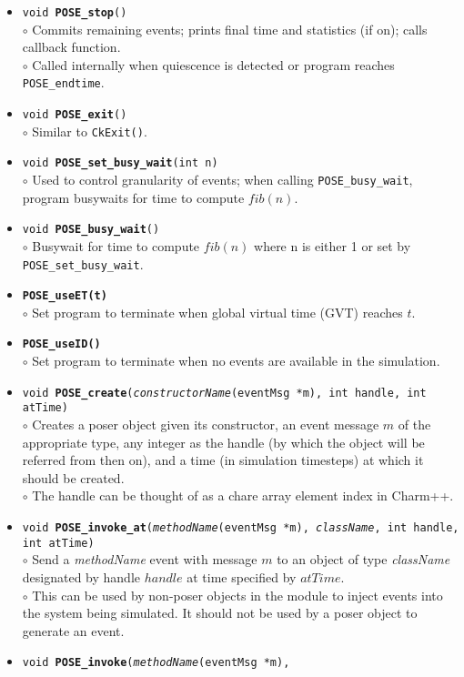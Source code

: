 \begin{itemize}
\item {\tt void {\bf POSE\_stop}()}\\
	$\circ$ Commits remaining events; prints final time and
	statistics (if on); calls callback function.\\
	$\circ$ Called internally when quiescence is detected or
	program reaches {\tt POSE\_endtime}.
\item {\tt void {\bf POSE\_exit}()}\\
	$\circ$ Similar to {\tt CkExit()}.
\item {\tt void {\bf POSE\_set\_busy\_wait}(int n)}\\
	$\circ$ Used to control granularity of events; when calling
	{\tt POSE\_busy\_wait}, program busywaits for time to compute $fib(n)$.
\item {\tt void {\bf POSE\_busy\_wait}()}\\
	$\circ$ Busywait for time to compute $fib(n)$ where n is either
	1 or set by {\tt POSE\_set\_busy\_wait}.
\item {\tt {\bf POSE\_useET(t)}}\\
	$\circ$ Set program to terminate when global
	virtual time (GVT) reaches $t$.
\item {\tt {\bf POSE\_useID()}}\\
	$\circ$ Set program to terminate when no events are available
	in the simulation.
\item {\tt void {\bf POSE\_create}({\it constructorName}(eventMsg *m), int
handle, int atTime)}\\
	$\circ$ Creates a poser object given its constructor, an event
	message $m$ of the appropriate type, any integer as the handle
	(by which the object will be referred from then on), and a
	time (in simulation timesteps) at which it should be created.\\ 
	$\circ$ The handle can be thought of as a chare array element
	index in Charm++.
\item {\tt void {\bf POSE\_invoke\_at}({\it methodName}(eventMsg *m),
{\it className}, int handle, int atTime)}\\
	$\circ$ Send a {\it methodName} event with message $m$ to an
	object of type {\it className} designated by handle $handle$
	at time specified by $atTime$.\\
	$\circ$ This can be used by non-poser objects in the \pose{}
	module to inject events into the system being simulated.  It
	should not be used by a poser object to generate an event.
\item {\tt void {\bf POSE\_invoke}({\it methodName}(eventMsg *m),
}
\end{itemize}
